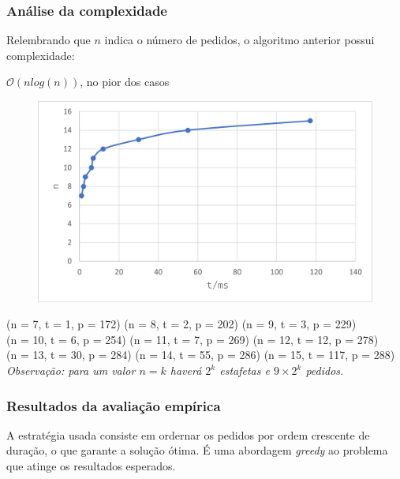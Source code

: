 \documentclass{beamer}
\begin{document}
\begin{frame}
\frametitle{Análise da complexidade}
Relembrando que $n$ indica o número de pedidos, o algoritmo anterior
possui complexidade: \\
\centerline{$\mathcal{O}(nlog(n))$, no pior dos casos}

\begin{figure}
\includegraphics[width=0.5\linewidth]{assets/scenario3.png}
\end{figure}
{\scriptsize (n = 7, t = 1, p = 172) \hspace{0.1cm} (n = 8, t = 2, p = 202) \hspace{0.1cm} (n = 9, t = 3, p = 229)}\\
{\scriptsize (n = 10, t = 6, p = 254) \hspace{0.1cm} (n = 11, t = 7, p = 269) \hspace{0.1cm} (n = 12, t = 12, p = 278)}\\
{\scriptsize (n = 13, t = 30, p = 284) \hspace{0.1cm} (n = 14, t = 55, p = 286) \hspace{0.1cm} (n = 15, t = 117, p = 288)}\\

{\footnotesize \textit{Observação: para um valor $n = k$ haverá $2^{k}$ estafetas e $ 9 \times 2^{k}$ pedidos.}}
\end{frame}

\begin{frame}
\frametitle{Resultados da avaliação empírica}
A estratégia usada consiste em ordernar os pedidos por ordem crescente de duração, o que garante a solução ótima.
É uma abordagem \textit{greedy} ao problema que atinge os resultados esperados.
\end{frame}






\end{document}
